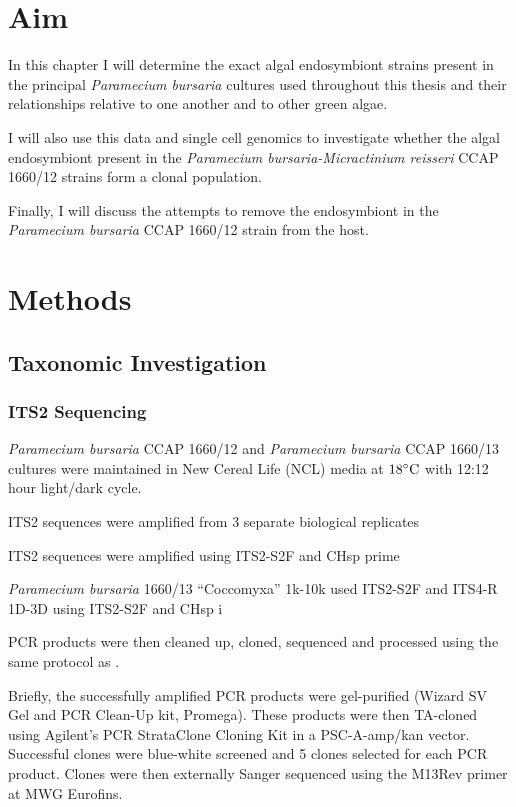 \section{Aim}

In this chapter I will determine the exact algal endosymbiont strains present
in the principal \textit{Paramecium bursaria} cultures used throughout
this thesis and their relationships relative to one another and to
other green algae. 

I will also use this data and single cell genomics to investigate whether the algal
endosymbiont present in the \textit{Paramecium bursaria-Micractinium reisseri}
CCAP 1660/12 strains form a clonal population. 

Finally, I will discuss the attempts to remove the endosymbiont in the 
\textit{Paramecium bursaria} CCAP 1660/12 strain from the host.

\section{Methods}

\subsection{Taxonomic Investigation}
    
\subsubsection{ITS2 Sequencing}

\textit{Paramecium bursaria} CCAP 1660/12 and \textit{Paramecium bursaria} CCAP 
1660/13 cultures were maintained in New Cereal Life (NCL) media
at \(18\celsius\) with 12:12 hour light/dark cycle.

ITS2 sequences were amplified from 3 separate biological replicates 



ITS2 sequences were amplified using ITS2-S2F and CHsp prime


\textit{Paramecium bursaria} 1660/13 ``Coccomyxa'' 
1k-10k used ITS2-S2F and ITS4-R
1D-3D using ITS2-S2F and CHsp
i


PCR products were then cleaned up, cloned, sequenced
and processed using the same protocol as \citep{Maguire2014a}.

Briefly, the successfully amplified PCR products were gel-purified 
(Wizard SV Gel and PCR Clean-Up kit, Promega).
These products were then TA-cloned 
using Agilent's PCR StrataClone Cloning Kit in a PSC-A-amp/kan
vector.
Successful clones were blue-white screened and 5 clones
selected for each PCR product.  
Clones were then externally Sanger sequenced using the M13Rev primer
at MWG Eurofins. 


